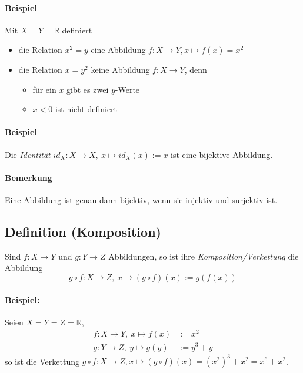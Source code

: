 \paragraph{Beispiel}
	Mit $X=Y=\mathbb{R}$ definiert
	\begin{itemize}
		\item die Relation $x^2 = y$ eine Abbildung $f:X\to Y, x\mapsto f(x)=x^2$
		\item die Relation $x=y^2$ keine Abbildung $f:X\to Y$, denn
		\begin{itemize}
			\item für ein $x$ gibt es zwei $y$-Werte
			\item $x < 0$ ist nicht definiert
		\end{itemize}
	\end{itemize}

\paragraph{Beispiel}
	Die \emph{Identität} $id_X :X\to X,\ x\mapsto id_X(x):= x$ ist eine bijektive Abbildung.
	
\paragraph{Bemerkung}
	Eine Abbildung ist genau dann bijektiv, wenn sie injektiv und surjektiv ist.
	
\subsection*{Definition (Komposition)}
	\begin{Definition}[Komposition]
		Sind $ f:X\to Y $ und $ g:Y\to Z$ Abbildungen, so ist ihre \emph{Komposition/Verkettung} die Abbildung 
		\[g\circ f:X\to Z,\ x\mapsto (g\circ f)(x):= g(f(x))\]
	\end{Definition}
	
\paragraph{Beispiel:}
	Seien $ X = Y = Z = \mathbb{R} $,
	\begin{align*}
            f:X\to Y,\ x\mapsto f(x) &:=x^2 \\
            g:Y\to Z,\ y\mapsto g(y)&:=y^3 + y
	\end{align*}
	so ist die Verkettung $ g\circ f: X\to Z, x\mapsto (g\circ f)(x) = (x^2)^3+x^2 = x^6 + x^2 $.

